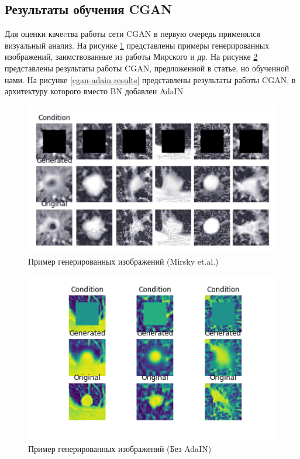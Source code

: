 \subsection{Результаты обучения CGAN}

Для оценки качеcтва работы сети CGAN в первую очередь применялся визуальный анализ. На рисунке \ref{mirskiy-results} представлены примеры генерированных изображений, заимствованные из работы Мирского и др. На рисунке \ref{cgan-baseline-results} представлены результаты работы CGAN, предложенной в статье, но обученной нами. На рисунке \ref{cgan-adain-results} представлены результаты работы CGAN, в архитектуру которого вместо BN добавлен AdaIN

\begin{figure}[!h]
\includegraphics[width=\linewidth]{images/mirskiy-results.jpg}
\caption{Пример генерированных изображений (Mirsky et.al.)}\label{mirskiy-results}
\centering
\end{figure}

\begin{figure}[!h]
\includegraphics[width=\linewidth]{images/no-adain.png}
\caption{Пример генерированных изображений (Без AdaIN)}\label{cgan-baseline-results}
\centering
\end{figure}

